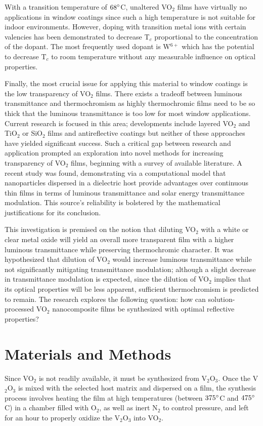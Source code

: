 \documentclass[a4paper]{article}
\begin{document}
With a transition temperature of $68\degree $C, unaltered VO$_2$ films have virtually no applications in window coatings since such a high temperature is not suitable for indoor environments. However, doping with transition metal ions with certain valencies has been demonstrated to decrease T$_c$ proportional to the concentration of the dopant. \cite{goodenough} The most frequently used dopant is W$^{6+}$ which has the potential to decrease T$_c$ to room temperature without any measurable influence on optical properties. \cite{kong}

Finally, the most crucial issue for applying this material to window coatings is the low transparency of VO$_2$ films. There exists a tradeoff between luminous transmittance and thermochromism as highly thermochromic films need to be so thick that the luminous transmittance is too low for most window applications. Current research is focused in this area; developments include layered VO$_2$ and TiO$_2$ or SiO$_2$ films and antireflective coatings but neither of these approaches have yielded significant success. \cite{jin,kakiuchida} Such a critical gap between research and application prompted an exploration into novel methods for increasing transparency of VO$_2$ films, beginning with a survey of available literature. A recent study was found, demonstrating via a computational model that nanoparticles dispersed in a dielectric host provide advantages over continuous thin films in terms of luminous transmittance and solar energy transmittance modulation. \cite{li} This source’s reliability is bolstered by the mathematical justifications for its conclusion.

This investigation is premised on the notion that diluting VO$_2$ with a white or clear metal oxide will yield an overall more transparent film with a higher luminous transmittance while preserving thermochromic character. It was hypothesized that dilution of VO$_2$ would increase luminous transmittance while not significantly mitigating transmittance modulation; although a slight decrease in transmittance modulation is expected, since the dilution of VO$_2$ implies that its optical properties will be less apparent, sufficient thermochromism is predicted to remain. The research explores the following question: how can solution-processed VO$_2$ nanocomposite films be synthesized with optimal reflective properties?


\section{Materials and Methods}
Since VO$_2$ is not readily available, it must be synthesized from V$_2$O$_3$. Once the V$_2$O$_3$ is mixed with the selected host matrix and dispersed on a film, the synthesis process involves heating the film at high temperatures (between $375\degree $C and $475\degree $C) in a chamber filled with O$_2$, as well as inert N$_2$ to control pressure, and left for an hour to properly oxidize the V$_2$O$_3$ into VO$_2$.
\end{document}
